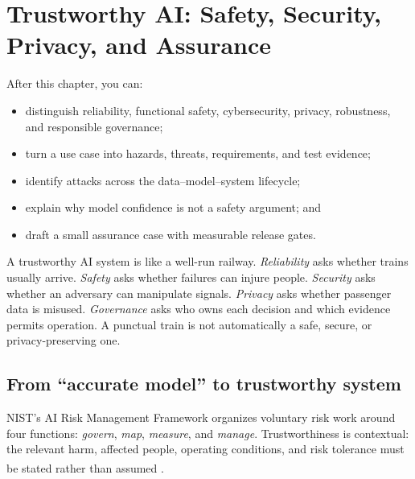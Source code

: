 \chapter{Trustworthy AI: Safety, Security, Privacy, and Assurance}
\label{ch:trustworthy-ai}

\begin{learningobjectives}
After this chapter, you can:
\begin{itemize}
    \item distinguish reliability, functional safety, cybersecurity, privacy,
          robustness, and responsible governance;
    \item turn a use case into hazards, threats, requirements, and test
          evidence;
    \item identify attacks across the data--model--system lifecycle;
    \item explain why model confidence is not a safety argument; and
    \item draft a small assurance case with measurable release gates.
\end{itemize}
\end{learningobjectives}

\begin{plainlanguage}
A trustworthy AI system is like a well-run railway. \emph{Reliability} asks
whether trains usually arrive. \emph{Safety} asks whether failures can injure
people. \emph{Security} asks whether an adversary can manipulate signals.
\emph{Privacy} asks whether passenger data is misused. \emph{Governance} asks
who owns each decision and which evidence permits operation. A punctual train
is not automatically a safe, secure, or privacy-preserving one.
\end{plainlanguage}

\section{From ``accurate model'' to trustworthy system}

NIST's AI Risk Management Framework organizes voluntary risk work around four
functions: \emph{govern}, \emph{map}, \emph{measure}, and \emph{manage}.
Trustworthiness is contextual: the relevant harm, affected people, operating
conditions, and risk tolerance must be stated rather than assumed
\textsuperscript{\cite{nistAIRiskManagement2023}}.


